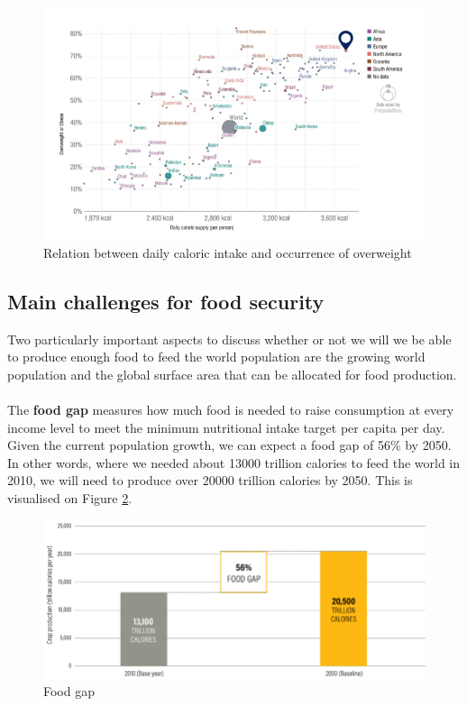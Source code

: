 \documentclass[../summary.tex]{subfiles}
\begin{document}
	\begin{figure} [htbp]
		\centering
		\includegraphics[width=0.9\linewidth]{images/6-obesity-and-caloric-intake.png}
		\caption{Relation between daily caloric intake and occurrence of overweight}
		\label{fig:obesity-and-caloric-intak}
	\end{figure}
	
	\subsection{Main challenges for food security}
	
	Two particularly important aspects to discuss whether or not we will we be able to produce enough food to feed the world population are the growing world population and the global surface area that can be allocated for food production. 
	\\\\
	The \textbf{food gap} measures how much food is needed to raise consumption at every income level to meet the minimum nutritional intake target per capita per day. Given the current population growth, we can expect a food gap of 56\% by 2050. In other words, where we needed about 13000 trillion calories to feed the world in 2010, we will need to produce over 20000 trillion calories by 2050. This is visualised on Figure \ref{fig:food_gap}.
	
	\begin{figure}[htbp]
		\centering
		\includegraphics[width=1\linewidth]{images/6-food-gap.png}
		\caption{Food gap}
		\label{fig:food_gap}
	\end{figure}
	
\end{document}

